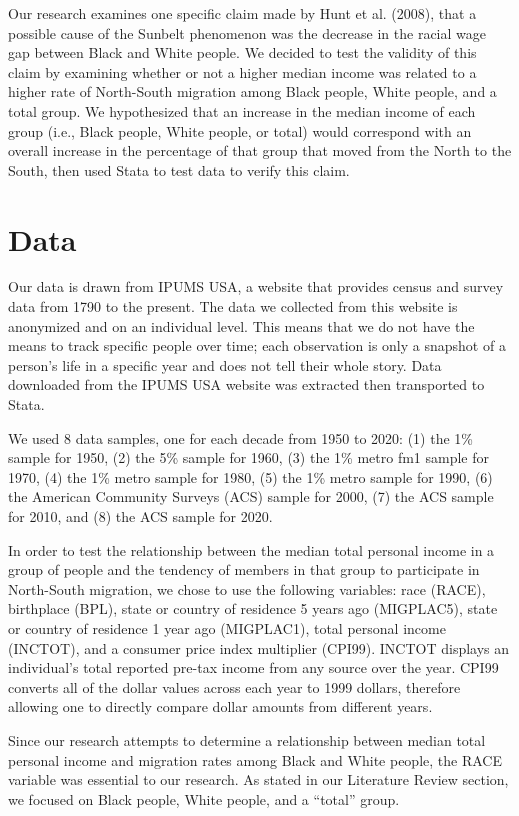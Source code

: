 \documentclass[12pt]{article}
\begin{document}
Our research examines one specific claim made by Hunt et al. (2008), that a possible cause of the Sunbelt phenomenon was the decrease in the racial wage gap between Black and White people. We decided to test the validity of this claim by examining whether or not a higher median income was related to a higher rate of North-South migration among Black people, White people, and a total group. We hypothesized that an increase in the median income of each group (i.e., Black people, White people, or total) would correspond with an overall increase in the percentage of that group that moved from the North to the South, then used Stata to test data to verify this claim. 

\section{Data}
\label{sec:data}

Our data is drawn from IPUMS USA, a website that provides census and survey data from 1790 to the present. The data we collected from this website is anonymized and on an individual level. This means that we do not have the means to track specific people over time; each observation is only a snapshot of a person’s life in a specific year and does not tell their whole story. Data downloaded from the IPUMS USA website was extracted then transported to Stata. 

We used 8 data samples, one for each decade from 1950 to 2020: (1) the 1\% sample for 1950, (2) the 5\% sample for 1960, (3) the 1\% metro fm1 sample for 1970, (4) the 1\% metro sample for 1980, (5) the 1\% metro sample for 1990, (6) the American Community Surveys (ACS) sample for 2000, (7) the ACS sample for 2010, and (8) the ACS sample for 2020. 

In order to test the relationship between the median total personal income in a group of people and the tendency of members in that group to participate in North-South migration, we chose to use the following variables: race (RACE), birthplace (BPL), state or country of residence 5 years ago (MIGPLAC5), state or country of residence 1 year ago (MIGPLAC1), total personal income (INCTOT), and a consumer price index multiplier (CPI99). INCTOT displays an individual’s total reported pre-tax income from any source over the year. CPI99 converts all of the dollar values across each year to 1999 dollars, therefore allowing one to directly compare dollar amounts from different years. 

Since our research attempts to determine a relationship between median total personal income and migration rates among Black and White people, the RACE variable was essential to our research. As stated in our Literature Review section, we focused on Black people, White people, and a “total” group. 
\end{document}
